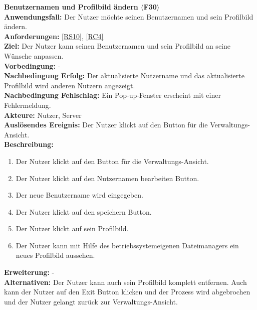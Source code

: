 \documentclass[parskip=full]{scrartcl}
\begin{document}
\textbf{Benutzernamen und Profilbild ändern $\langle$F30$\rangle$}\\
\textbf{Anwendungsfall:} Der Nutzer möchte seinen Benutzernamen und sein Profilbild ändern.\\
\textbf{Anforderungen:} \ref{RS10}, \ref{RC4}\\
\textbf{Ziel:} Der Nutzer kann seinen Benutzernamen und sein Profilbild an seine Wünsche anpassen.\\
\textbf{Vorbedingung:} -\\
\textbf{Nachbedingung Erfolg:} Der aktualisierte Nutzername und das aktualisierte Profilbild wird anderen Nutzern angezeigt.\\
\textbf{Nachbedingung Fehlschlag:} Ein Pop-up-Fenster erscheint mit einer Fehlermeldung.\\
\textbf{Akteure:} Nutzer, Server\\
\textbf{Auslösendes Ereignis:} Der Nutzer klickt auf den Button für die Verwaltungs-Ansicht.\\
\textbf{Beschreibung:}
\begin{enumerate}
    \item Der Nutzer klickt auf den Button für die Verwaltungs-Ansicht.\\
    \item Der Nutzer klickt auf den Nutzernamen bearbeiten Button.
    \item Der neue Benutzername wird eingegeben.
    \item Der Nutzer klickt auf den speichern Button.
    \item Der Nutzer klickt auf sein Profilbild.
    \item Der Nutzer kann mit Hilfe des betriebssystemeigenen Dateimanagers ein neues Profilbild aussehen.
\end{enumerate}
\textbf{Erweiterung:} -\\
\textbf{Alternativen:} Der Nutzer kann auch sein Profilbild komplett entfernen. Auch kann der Nutzer auf den Exit Button klicken und der Prozess wird abgebrochen und der Nutzer gelangt zurück zur Verwaltungs-Ansicht.\\
\newpage
\end{document}
